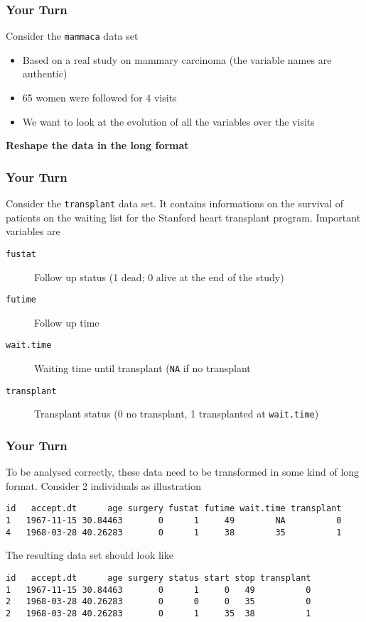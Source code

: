 \documentclass[paper=screen,mathserif]{beamer}\usepackage[]{graphicx}\usepackage[]{color}
\newcommand{\ft}[1]{\frametitle{#1}}
\begin{document}
\begin{frame}[fragile]
  \ft{Your Turn}

  Consider the \verb=mammaca= data set
  \begin{itemize}
  \item Based on a real study on mammary carcinoma (the variable names
    are authentic)
  \item 65 women were followed for 4 visits
  \item We want to look at the evolution of all the variables over the
    visits
  \end{itemize}
  {\bf Reshape the data in the long format} 
  
\end{frame}

\begin{frame}[fragile]
  \ft{Your Turn}

  Consider the {\tt transplant} data set. It contains informations on
  the survival of patients on the waiting list for the Stanford heart
  transplant program. Important variables are
  \begin{description}
    \item[{\tt fustat}] Follow up status (1 dead; 0 alive at the end
      of the study)
    \item[{\tt futime}] Follow up time
    \item[{\tt wait.time}] Waiting time until transplant ({\tt NA} if
      no transplant
    \item[{\tt transplant}] Transplant status (0 no transplant, 1
      transplanted at {\tt wait.time})
  \end{description}

\end{frame}

\begin{frame}[fragile]
  \ft{Your Turn}

  To be analysed correctly, these data need to be transformed in some
  kind of long format. Consider 2 individuals as illustration
{\scriptsize
\begin{verbatim}
id   accept.dt      age surgery fustat futime wait.time transplant
1   1967-11-15 30.84463       0      1     49        NA          0
4   1968-03-28 40.26283       0      1     38        35          1
\end{verbatim}}

  The resulting data set should look like
  {\scriptsize
\begin{verbatim}
id   accept.dt      age surgery status start stop transplant
1   1967-11-15 30.84463       0      1     0   49          0
2   1968-03-28 40.26283       0      0     0   35          0
2   1968-03-28 40.26283       0      1     35  38          1
\end{verbatim}}

\end{frame}
\end{document}
